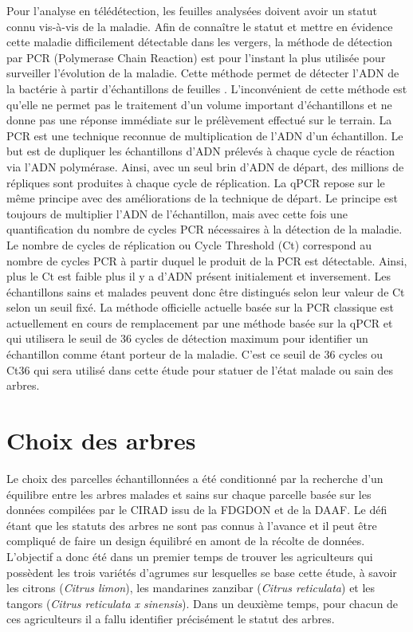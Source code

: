 \documentclass[
  11pt,
  french,
  a4paper,
  extrafontsizes,onecolumn,openright
  ]{memoir}
\begin{document}
Pour l'analyse en télédétection, les feuilles analysées doivent avoir un statut connu vis-à-vis de la maladie. Afin de connaître le statut et mettre en évidence cette maladie difficilement détectable dans les vergers, la méthode de détection par PCR (Polymerase Chain Reaction) est pour l'instant la plus utilisée pour surveiller l'évolution de la maladie. Cette méthode permet de détecter l'ADN de la bactérie à partir d'échantillons de feuilles \autocite{gottwald_current_2010}. L'inconvénient de cette méthode est qu'elle ne permet pas le traitement d'un volume important d'échantillons et ne donne pas une réponse immédiate sur le prélèvement effectué sur le terrain. La PCR est une technique reconnue de multiplication de l'ADN d'un échantillon. Le but est de dupliquer les échantillons d'ADN prélevés à chaque cycle de réaction via l'ADN polymérase. Ainsi, avec un seul brin d'ADN de départ, des millions de répliques sont produites à chaque cycle de réplication. La qPCR repose sur le même principe avec des améliorations de la technique de départ. Le principe est toujours de multiplier l'ADN de l'échantillon, mais avec cette fois une quantification du nombre de cycles PCR nécessaires à la détection de la maladie. Le nombre de cycles de réplication ou Cycle Threshold (Ct) correspond au nombre de cycles PCR à partir duquel le produit de la PCR est détectable. Ainsi, plus le Ct est faible plus il y a d'ADN présent initialement et inversement. Les échantillons sains et malades peuvent donc être distingués selon leur valeur de Ct selon un seuil fixé.
La méthode officielle actuelle basée sur la PCR classique est actuellement en cours de remplacement par une méthode basée sur la qPCR et qui utilisera le seuil de 36 cycles de détection maximum pour identifier un échantillon comme étant porteur de la maladie. C'est ce seuil de 36 cycles ou Ct36 qui sera utilisé dans cette étude pour statuer de l'état malade ou sain des arbres.

\hypertarget{choix-des-arbres}{%
\section{Choix des arbres}\label{choix-des-arbres}}

Le choix des parcelles échantillonnées a été conditionné par la recherche d'un équilibre entre les arbres malades et sains sur chaque parcelle basée sur les données compilées par le CIRAD issu de la FDGDON et de la DAAF. Le défi étant que les statuts des arbres ne sont pas connus à l'avance et il peut être compliqué de faire un design équilibré en amont de la récolte de données. L'objectif a donc été dans un premier temps de trouver les agriculteurs qui possèdent les trois variétés d'agrumes sur lesquelles se base cette étude, à savoir les citrons (\emph{Citrus limon}), les mandarines zanzibar (\emph{Citrus reticulata}) et les tangors (\emph{Citrus reticulata x sinensis}). Dans un deuxième temps, pour chacun de ces agriculteurs il a fallu identifier précisément le statut des arbres.
\end{document}
